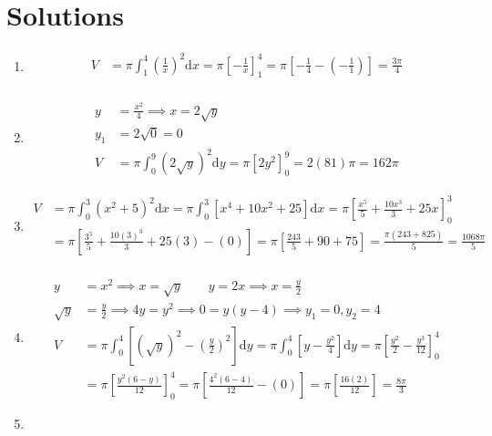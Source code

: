 \documentclass[12pt, A4]{report}
\renewcommand{\d}{\text{d}}
\begin{document}
		\section*{Solutions}
			\begin{enumerate}
				\item
					\begin{align*}
						V &= \pi\int_1^4\left(\frac{1}{x}\right)^2\d x
								 = \pi\left[-\frac{1}{x}\right]_1^4
								 = \pi\left[-\frac{1}{4} -\left(-\frac{1}{1}\right)\right]
								 = \frac{3\pi}{4} \\
					\end{align*}
				\item
					\begin{align*}
						y &= \frac{x^2}{4} \implies x = 2\sqrt{y} \\
						y_1 &= 2\sqrt{0} = 0 \\
						V &= \pi\int_0^9\left(2\sqrt{y}\right)^2\d y = \pi\left[2y^2\right]_0^9 = 2(81)\pi = 162\pi
					\end{align*}
				\item
					\begin{align*}
						V &= \pi\int_0^3\left(x^2 + 5\right)^2\d x 
								= \pi\int_{0}^3\left[x^4 + 10x^2 + 25\right]\d x 
								= \pi\left[\frac{x^5}{5} + \frac{10x^3}{3} + 25x\right]_0^3 \\
							&= \pi\left[\frac{3^5}{5} + \frac{10(3)^3}{3} + 25(3) - (0)\right] 
								= \pi\left[\frac{243}{5} + 90 + 75\right] 
								= \frac{\pi(243 + 825)}{5} 
								= \frac{1068\pi}{5} \\
					\end{align*}
				\item
					\begin{align*}
						y &= x^2 \implies x = \sqrt{y} \qquad 
								y = 2x \implies x = \frac{y}{2} \\
						\sqrt{y} &= \frac{y}{2} 
								\implies 4y = y^2 
								\implies 0 = y(y - 4) 
								\implies y_1 = 0, y_2 = 4 \\
						V &= \pi\int_0^4\left[\left(\sqrt{y}\right)^2 - \left(\frac{y}{2}\right)^2\right]\d y
							 	= \pi\int_0^4\left[y - \frac{y^2}{4}\right]\d y
							 	= \pi\left[\frac{y^2}{2} - \frac{y^3}{12}\right]_0^4 \\
							 &= \pi\left[\frac{y^2(6 - y)}{12}\right]_0^4
							 	= \pi\left[\frac{4^2(6 - 4)}{12} - (0)\right]
							 	= \pi\left[\frac{16(2)}{12}\right]
							 	= \frac{8\pi}{3}
					\end{align*}
				\item

\end{enumerate}
\end{document}
